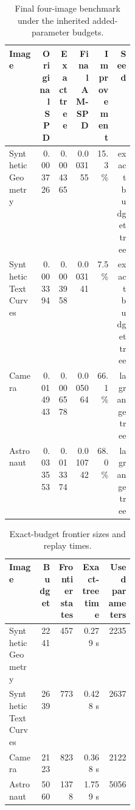 \begin{table}[H]
\centering
\small
\begin{tabular}{L{0.24\linewidth}rrrrr}
\toprule
Image & Original SPD & Exact tree & Final AM-SPD & Improvement & Seed\\
\midrule
Synthetic Geometry & 0.003726 & 0.004365 & 0.003155 & 15.3\% & exact budget tree\\
Synthetic Text Curves & 0.003394 & 0.003958 & 0.003141 & 7.5\% & exact budget tree\\
Camera & 0.014943 & 0.006578 & 0.005064 & 66.1\% & lagrange tree\\
Astronaut & 0.033553 & 0.013374 & 0.010742 & 68.0\% & lagrange tree\\
\bottomrule
\end{tabular}
\caption{Final four-image benchmark under the inherited added-parameter budgets.}
\label{tab:final-four-case}
\end{table}

\begin{table}[H]
\centering
\small
\begin{tabular}{L{0.24\linewidth}rrrr}
\toprule
Image & Budget & Frontier states & Exact-tree time & Used parameters\\
\midrule
Synthetic Geometry & 2241 & 457 & 0.279 s & 2235\\
Synthetic Text Curves & 2639 & 773 & 0.428 s & 2637\\
Camera & 2123 & 823 & 0.368 s & 2122\\
Astronaut & 5060 & 1378 & 1.759 s & 5056\\
\bottomrule
\end{tabular}
\caption{Exact-budget frontier sizes and replay times.}
\label{tab:exact-frontier}
\end{table}

